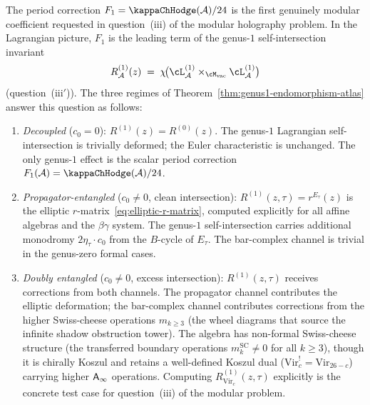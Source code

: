 \begin{remark}%
\label{rem:modular-problem-genus1}%
%
%
The period correction $F_1 = \kappaChHodge(\cA)/24$ is the
first genuinely modular coefficient requested in
question~(iii) of the modular holography problem.
In the Lagrangian picture, $F_1$ is the leading term
of the genus-$1$ self-intersection invariant
\[
R^{(1)}_\cA(z)
\;=\;
\chi\!\bigl(
 \cL_\cA^{(1)} \times_{\Mvac} \cL_\cA^{(1)}
\bigr)
\]
(question~(iii$'$)). The three regimes of
Theorem~\ref{thm:genus1-endomorphism-atlas}
answer this question as follows:
\begin{enumerate}[label=\textup{(\alph*)},nosep]
\item \emph{Decoupled} ($c_0 = 0$):
 $R^{(1)}(z) = R^{(0)}(z)$. The genus-$1$
 Lagrangian self-intersection is trivially deformed;
 the Euler characteristic is unchanged. The only
 genus-$1$ effect is the scalar period correction
 $F_1(\cA)=\kappaChHodge(\cA)/24$.

\item \emph{Propagator-entangled} ($c_0 \ne 0$, clean
 intersection):
 $R^{(1)}(z,\tau) = r^{E_\tau}(z)$ is the elliptic
 $r$-matrix~\eqref{eq:elliptic-r-matrix}, computed
 explicitly for all affine algebras and the
 $\beta\gamma$ system. The genus-$1$
 self-intersection carries additional monodromy
 $2\eta_\tau \cdot c_0$ from the $B$-cycle of
 $E_\tau$. The bar-complex channel is trivial in the
 genus-zero formal cases.

\item \emph{Doubly entangled} ($c_0 \ne 0$, excess
 intersection):
 $R^{(1)}(z,\tau)$ receives corrections from both
 channels. The propagator channel contributes the
 elliptic deformation; the bar-complex channel
 contributes corrections from the higher Swiss-cheese
 operations $m_{k \ge 3}$ (the wheel diagrams that
 source the infinite shadow obstruction tower). The algebra
 has non-formal Swiss-cheese structure (the transferred
 boundary operations $m_k^{\mathrm{SC}} \ne 0$ for all
 $k \ge 3$), though it is chirally Koszul and retains a
 well-defined Koszul dual ($\mathrm{Vir}_c^! = \mathrm{Vir}_{26-c}$)
 carrying higher $\mathsf{A}_{\infty}$ operations. Computing
 $R^{(1)}_{\mathrm{Vir}_c}(z,\tau)$ explicitly is
 the concrete test case for question~(iii) of the
 modular problem.
\end{enumerate}
\end{remark}

